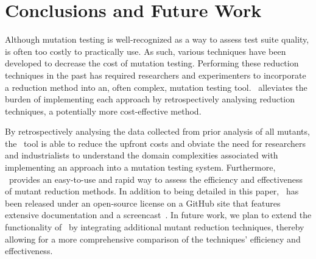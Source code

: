 \section{Conclusions and Future Work}

Although mutation testing is well-recognized as a way to assess test suite
quality, is often too costly to practically use. As such, various techniques
have been developed to decrease the cost of mutation testing. Performing these
reduction techniques in the past has required researchers and experimenters to
incorporate a reduction method into an, often complex, mutation testing tool.
\mr~alleviates the burden of implementing each approach by retrospectively
analysing reduction techniques, a potentially more cost-effective method.

By retrospectively analysing the data collected from prior analysis of all
mutants, the \mr~tool is able to reduce the upfront costs and obviate the need
for researchers and industrialists to understand the domain complexities
associated with implementing an approach into a mutation testing system.
Furthermore, \mr~provides an easy-to-use and rapid way to assess the efficiency
and effectiveness of mutant reduction methods. In addition to being detailed in
this paper, \mr~has been released under an open-source license on a GitHub site
that features extensive documentation and a screencast~\cite{tool}. In future
work, we plan to extend the functionality of \mr~by integrating additional
mutant reduction techniques, thereby allowing for a more comprehensive
comparison of the techniques' efficiency and effectiveness.

